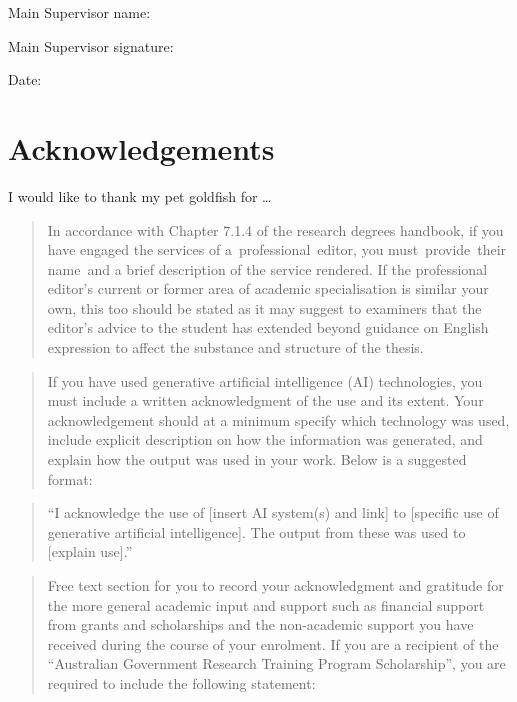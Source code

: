 \documentclass[
  11pt,
  a4paper,
]{report}
\begin{document}
Main Supervisor name:

Main Supervisor signature:

Date:


\chapter*{Acknowledgements}\label{acknowledgements}


I would like to thank my pet goldfish for \ldots{}

\begin{quote}
In accordance with Chapter 7.1.4 of the research degrees handbook, if
you have engaged the services of a~professional~editor, you
must~provide~their name~and a brief description of the service rendered.
If the professional editor's current or former area of academic
specialisation is similar your own, this too should be stated as it may
suggest to examiners that the editor's advice to the student has
extended beyond guidance on English expression to affect the substance
and structure of the thesis.
\end{quote}

\begin{quote}
If you have used generative artificial intelligence (AI) technologies,
you must include a written acknowledgment of the use and its extent.
Your acknowledgement should at a minimum specify which technology was
used, include explicit description on how the information was generated,
and explain how the output was used in your work. Below is a suggested
format:
\end{quote}

\begin{quote}
``I acknowledge the use of {[}insert AI system(s) and link{]} to
{[}specific use of generative artificial intelligence{]}. The output
from these was used to {[}explain use{]}.''
\end{quote}

\begin{quote}
Free text section for you to record your acknowledgment and gratitude
for the more general academic input and support such as financial
support from grants and scholarships and the non-academic support you
have received during the course of your enrolment. If you are a
recipient of the ``Australian Government Research Training Program
Scholarship'', you are required to include the following statement:
\end{quote}
\end{document}
